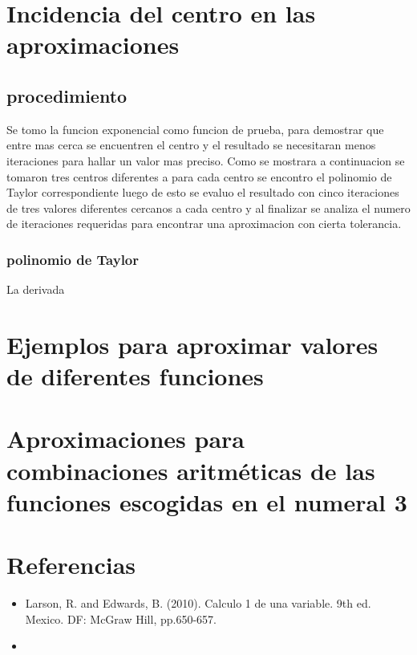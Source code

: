 \documentclass[12pt]{article}
\begin{document}
    
    \section{Incidencia del centro en las aproximaciones}
        \subsection{procedimiento}
        Se tomo la funcion exponencial como funcion de prueba, para demostrar que entre mas 
        cerca se encuentren el centro y el resultado se necesitaran menos iteraciones para 
        hallar un valor mas preciso.
        Como se mostrara a continuacion se tomaron tres centros diferentes a para cada centro
        se encontro el polinomio de Taylor correspondiente luego de esto se evaluo el resultado
        con cinco iteraciones de tres valores diferentes cercanos a cada centro y al finalizar se
        analiza el numero de iteraciones requeridas para encontrar una aproximacion con cierta
        tolerancia.

        \subsubsection{polinomio de Taylor}
        La derivada


        \section {Ejemplos para aproximar valores de diferentes funciones}

        \section {Aproximaciones para combinaciones aritméticas de las funciones escogidas en el numeral 3}

        \section {Referencias}

        \begin{itemize}
        \item{Larson, R. and Edwards, B. (2010). Calculo 1 de una variable. 9th ed. Mexico. DF: McGraw Hill, pp.650-657.}
        \item{}
        \end{itemize}
\end{document}
